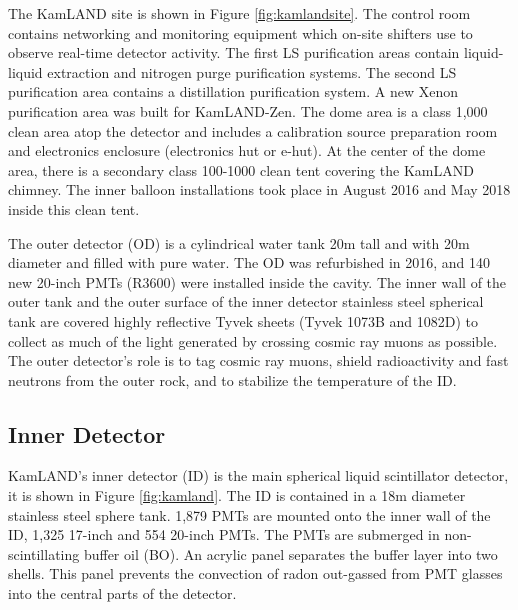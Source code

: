 The KamLAND site is shown in Figure \ref{fig:kamlandsite}. The control room contains networking and monitoring equipment which on-site shifters use to observe real-time detector activity. The first LS purification areas contain liquid-liquid extraction and nitrogen purge purification systems. The second LS purification area contains a distillation purification system. A new Xenon purification area was built for KamLAND-Zen. The dome area is a class 1,000 clean area atop the detector and includes a calibration source preparation room and electronics enclosure (electronics hut or e-hut). At the center of the dome area, there is a secondary class 100-1000 clean tent covering the KamLAND chimney. The inner balloon installations took place in August 2016 and May 2018 inside this clean tent.

The outer detector (OD) is a cylindrical water tank 20m tall and with 20m diameter and filled with pure water. The OD was refurbished in 2016, and 140 new 20-inch PMTs (R3600) were installed inside the cavity. The inner wall of the outer tank and the outer surface of the inner detector stainless steel spherical tank are covered highly reflective Tyvek sheets (Tyvek 1073B and 1082D) to collect as much of the light generated by crossing cosmic ray muons as possible. The outer detector's role is to tag cosmic ray muons, shield radioactivity and fast neutrons from the outer rock, and to stabilize the temperature of the ID.

\subsection{Inner Detector}
KamLAND's inner detector (ID) is the main spherical liquid scintillator detector, it is shown in Figure \ref{fig:kamland}. The ID is contained in a 18m diameter stainless steel sphere tank. 1,879 PMTs are mounted onto the inner wall of the ID, 1,325 17-inch and 554 20-inch PMTs. The PMTs are submerged in non-scintillating buffer oil (BO). An acrylic panel separates the buffer layer into two shells. This panel prevents the convection of radon out-gassed from PMT glasses into the central parts of the detector.

